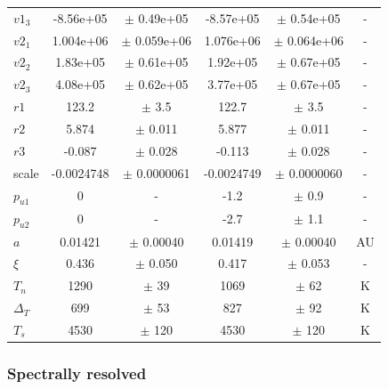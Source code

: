 \documentclass[a4paper,fleqn,usenatbib]{mnras}
\begin{document}
\begin{center}
\begin{table}
{\begin{center}
\begin{tabular}{l c c c c c}
$v1_3$ &    -8.56e+05 & $\pm$        0.49e+05 &    -8.57e+05 & $\pm$        0.54e+05 & -\\
$v2_1$ &    1.004e+06 & $\pm$       0.059e+06 &    1.076e+06 & $\pm$       0.064e+06 & -\\
$v2_2$ &     1.83e+05 & $\pm$        0.61e+05 &     1.92e+05 & $\pm$        0.67e+05 & -\\
$v2_3$ &     4.08e+05 & $\pm$        0.62e+05 &     3.77e+05 & $\pm$        0.67e+05 & -\\
$r1$ &        123.2 & $\pm$         3.5 &        122.7 & $\pm$         3.5 & -\\
$r2$ &        5.874 & $\pm$       0.011 &        5.877 & $\pm$       0.011 & -\\
$r3$ &       -0.087 & $\pm$       0.028 &       -0.113 & $\pm$       0.028 & -\\
scale &   -0.0024748 & $\pm$   0.0000061 &   -0.0024749 & $\pm$   0.0000060 & -\\
$p_{u1}$ & 0 & - &         -1.2 & $\pm$         0.9 & -\\
$p_{u2}$ & 0 & - &         -2.7 & $\pm$         1.1 & -\\
$a$ &      0.01421 & $\pm$     0.00040 &      0.01419 & $\pm$     0.00040 & AU\\
$\xi$ &        0.436 & $\pm$       0.050 &        0.417 & $\pm$       0.053 & -\\
$T_n$ &         1290 & $\pm$          39 &         1069 & $\pm$          62 & K\\
$\Delta_T$ &          699 & $\pm$          53 &          827 & $\pm$          92 & K\\
$T_s$ &         4530 & $\pm$         120 &         4530 & $\pm$         120 & K\\
\end{tabular}
\end{center}
\label{tab:results}
}
\end{table}
\end{center}

\subsubsection{Spectrally resolved}
\end{document}
